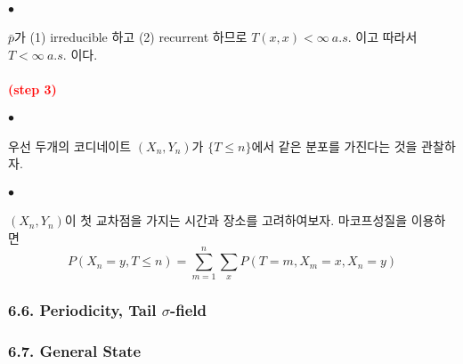 \documentclass[12pt,oneside,english]{book}
\def\ck{\paragraph{\Large$\bullet$}\Large}
\newcommand{\parared}[1]{\paragraph{\Large\textcolor{red}{(#1)}}\Large}
\begin{document}
\ck $\bar{p}$가 (1) irreducible 하고 (2) recurrent 하므로 $T(x,x)<\infty ~ a.s.$ 이고 따라서 $T <\infty ~ a.s.$ 이다. 

\parared{step 3} 

\ck 우선 두개의 코디네이트 $(X_n,Y_n)$가 $\{T\leq n\}$에서 같은 분포를 가진다는 것을 관찰하자. 

\ck $(X_n,Y_n)$이 첫 교차점을 가지는 시간과 장소를 고려하여보자. 마코프성질을 이용하면 
\[
P(X_n=y,T\leq n)= \sum_{m=1}^{n}\sum_xP(T=m,X_m=x,X_n=y)
\]


\subsubsection{6.6. Periodicity, Tail $\sigma$-field}

\subsubsection{6.7. General State}
\end{document}
